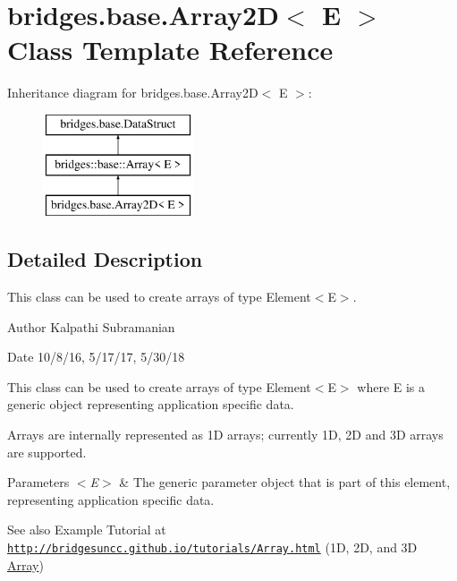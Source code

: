 \hypertarget{classbridges_1_1base_1_1_array2_d}{}\section{bridges.\+base.\+Array2D$<$ E $>$ Class Template Reference}
\label{classbridges_1_1base_1_1_array2_d}
Inheritance diagram for bridges.\+base.\+Array2D$<$ E $>$\+:\begin{figure}[H]
\begin{center}
\leavevmode
\includegraphics[height=3.000000cm]{classbridges_1_1base_1_1_array2_d}
\end{center}
\end{figure}


\subsection{Detailed Description}
This class can be used to create arrays of type Element$<$\+E$>$. 

\begin{DoxyAuthor}{Author}
Kalpathi Subramanian
\end{DoxyAuthor}
\begin{DoxyDate}{Date}
10/8/16, 5/17/17, 5/30/18
\end{DoxyDate}
This class can be used to create arrays of type Element$<$\+E$>$ where E is a generic object representing application specific data.

Arrays are internally represented as 1D arrays; currently 1D, 2D and 3D arrays are supported.


\begin{DoxyParams}{Parameters}
{\em $<$\+E$>$} & The generic parameter object that is part of this element, representing application specific data.\\
\hline
\end{DoxyParams}
\begin{DoxySeeAlso}{See also}
Example Tutorial at ~\newline
 \href{http://bridgesuncc.github.io/tutorials/Array.html}{\tt http\+://bridgesuncc.\+github.\+io/tutorials/\+Array.\+html} (1D, 2D, and 3D \mbox{\hyperlink{classbridges_1_1base_1_1_array}{Array}})~\newline
 
\end{DoxySeeAlso}
